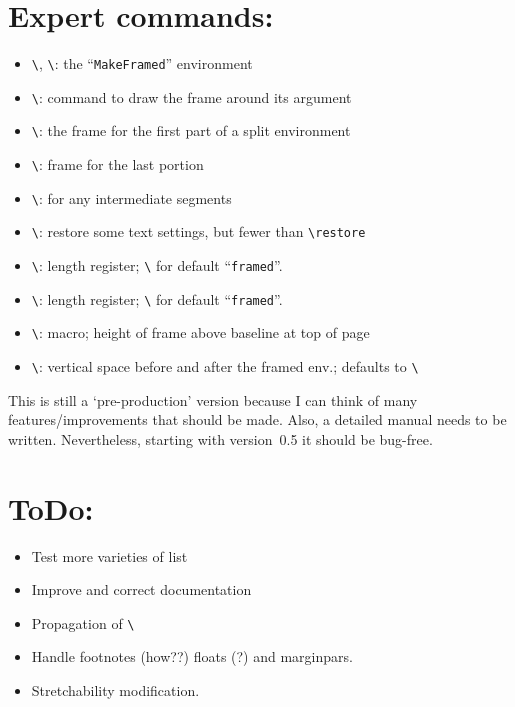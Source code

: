 \documentclass[DIV=8, pagesize=auto]{scrartcl}
\makeatletter
\newcommand*{\cs}[1]{\texttt{\textbackslash#1}}
\newcommand*{\cmd}[1]{\cs{\expandafter\@gobble\string#1}}
\newcommand*{\env}[1]{\texttt{#1}}
\makeatother
\begin{document}
\section*{Expert commands:}

\begin{itemize}
\item \cmd{\MakeFramed}, \cmd{\endMakeFramed}: the ``\env{MakeFramed}'' environment
\item \cmd{\FrameCommand}: command to draw the frame around its argument
\item \cmd{\FirstFrameCommand}: the frame for the first part of a split environment
\item \cmd{\LastFrameCommand}: frame for the last portion
\item \cmd{\MidFrameCommand}: for any intermediate segments
\item \cmd{\FrameRestore}: restore some text settings, but fewer than \cmd{\@parbox\-restore}
\item \cmd{\FrameRule}: length register; \cmd{\fboxrule} for default ``\env{framed}''.
\item \cmd{\FrameSep}: length register; \cmd{\fboxsep} for default ``\env{framed}''.
\item \cmd{\FrameHeightAdjust}: macro; height of frame above baseline at top of page
\item \cmd{\OuterFrameSep}: vertical space before and after the framed env.; defaults to \cmd{\topsep}
\end{itemize}

\medskip
This is still a `pre-production' version because I can think of many
features/improvements that should be made. Also, a detailed manual needs
to be written.  Nevertheless, starting with version~0.5 it should be bug-free.


\section*{ToDo:}

\begin{itemize}
\item Test more varieties of list 
\item Improve and correct documentation
\item Propagation of \cmd{\marks}
\item Handle footnotes (how??) floats (?) and marginpars.
\item Stretchability modification.
\end{itemize}
\end{document}
